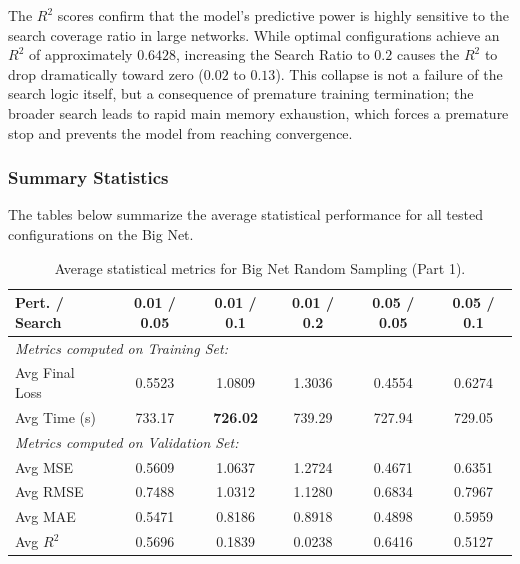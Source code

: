 The $R^2$ scores confirm that the model's predictive power is highly sensitive to the search coverage ratio in large networks. While optimal configurations achieve an $R^2$ of approximately $0.6428$, increasing the Search Ratio to $0.2$ causes the $R^2$ to drop dramatically toward zero ($0.02$ to $0.13$). This collapse is not a failure of the search logic itself, but a consequence of premature training termination; the broader search leads to rapid main memory exhaustion, which forces a premature stop and prevents the model from reaching convergence.
\subsubsection{Summary Statistics}

The tables below summarize the average statistical performance for all tested configurations on the Big Net.

\begin{table}[h]
\centering
\scriptsize
\begin{tabular}{|l|c|c|c|c|c|}
\hline
\textbf{Pert. / Search} & \textbf{0.01 / 0.05} & \textbf{0.01 / 0.1} & \textbf{0.01 / 0.2} & \textbf{0.05 / 0.05} & \textbf{0.05 / 0.1} \\ \hline
\multicolumn{6}{|l|}{\textit{Metrics computed on Training Set:}} \\ \hline
Avg Final Loss & 0.5523 & 1.0809 & 1.3036 & 0.4554 & 0.6274 \\ \hline
Avg Time (s)   & 733.17 & \textbf{726.02} & 739.29 & 727.94 & 729.05 \\ \hline
\multicolumn{6}{|l|}{\textit{Metrics computed on Validation Set:}} \\ \hline
Avg MSE        & 0.5609 & 1.0637 & 1.2724 & 0.4671 & 0.6351 \\ \hline
Avg RMSE       & 0.7488 & 1.0312 & 1.1280 & 0.6834 & 0.7967 \\ \hline
Avg MAE        & 0.5471 & 0.8186 & 0.8918 & 0.4898 & 0.5959 \\ \hline
Avg $R^2$      & 0.5696 & 0.1839 & 0.0238 & 0.6416 & 0.5127 \\ \hline
\end{tabular}
\caption{Average statistical metrics for Big Net Random Sampling (Part 1).}
\label{tab:big_net_random_part1}
\end{table}

